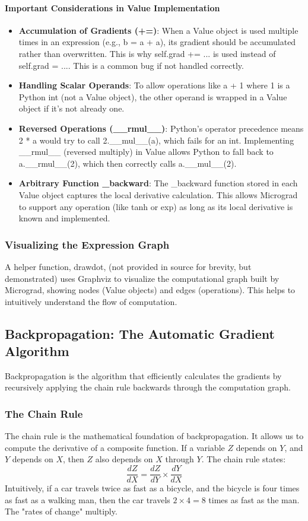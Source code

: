 \paragraph{Important Considerations in Value Implementation} 
\begin{itemize} 
\item \textbf{Accumulation of Gradients (+=)}: When a Value object is used multiple times in an expression (e.g., b = a + a), its gradient should be accumulated rather than overwritten. This is why self.grad += ... is used instead of self.grad = .... This is a common bug if not handled correctly. 
\item \textbf{Handling Scalar Operands}: To allow operations like a + 1 where 1 is a Python int (not a Value object), the other operand is wrapped in a Value object if it's not already one. 
\item \textbf{Reversed Operations (\_\_rmul\_\_)}: Python's operator precedence means 2 * a would try to call 2.\_\_mul\_\_(a), which fails for an int. Implementing \_\_rmul\_\_ (reversed multiply) in Value allows Python to fall back to a.\_\_rmul\_\_(2), which then correctly calls a.\_\_mul\_\_(2). 
\item \textbf{Arbitrary Function \_backward}: The \_backward function stored in each Value object captures the local derivative calculation. This allows Micrograd to support any operation (like tanh or exp) as long as its local derivative is known and implemented. 
\end{itemize}

\subsubsection{Visualizing the Expression Graph} 
A helper function, drawdot, (not provided in source for brevity, but demonstrated) uses Graphviz to visualize the computational graph built by Micrograd, showing nodes (Value objects) and edges (operations). This helps to intuitively understand the flow of computation.

\subsection{Backpropagation: The Automatic Gradient Algorithm}
Backpropagation is the algorithm that efficiently calculates the gradients by recursively applying the chain rule backwards through the computation graph.

\subsubsection{The Chain Rule} 
The chain rule is the mathematical foundation of backpropagation. It allows us to compute the derivative of a composite function. If a variable $Z$ depends on $Y$, and $Y$ depends on $X$, then $Z$ also depends on $X$ through $Y$. The chain rule states: 
$$ \frac{dZ}{dX} = \frac{dZ}{dY} \times \frac{dY}{dX} $$ 
Intuitively, if a car travels twice as fast as a bicycle, and the bicycle is four times as fast as a walking man, then the car travels $2 \times 4 = 8$ times as fast as the man. The "rates of change" multiply.

